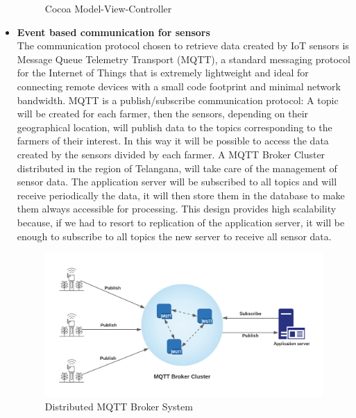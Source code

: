 \documentclass[10pt]{article} %
\begin{document}
\begin{itemize}
\begin{figure}[h]
        \caption{Cocoa Model-View-Controller}
        \label{fig:mvc}
    \end{figure}
    \newpage
    \item \textbf{Event based communication for sensors}\\The communication protocol chosen to retrieve 
    data created by IoT sensors is Message Queue Telemetry Transport (MQTT), a standard messaging 
    protocol for the Internet of Things that is extremely lightweight and ideal for connecting remote 
    devices with a small code footprint and minimal network bandwidth. MQTT is a publish/subscribe 
    communication protocol: A topic will be created for each farmer, then the sensors, depending on 
    their geographical location, will publish data to the topics corresponding to the farmers of 
    their interest. In this way it will be possible to access the data created by the sensors divided 
    by each farmer. A MQTT Broker Cluster distributed in the region of Telangana, will take care of 
    the management of sensor data. The application server will be subscribed to all topics and will 
    receive periodically the data, it will then store them in the database to make them always 
    accessible for processing.
    This design provides high scalability because, if we had to resort to replication of the 
    application server, it will be enough to subscribe to all topics the new server to receive 
    all sensor data.
    \begin{figure}[h!]
        \centering
        \includegraphics[scale=0.68]{images/mqtt.png}
        \caption{Distributed MQTT Broker System}
        \label{fig:mqtt}
    \end{figure}
\end{itemize}
\newpage
\end{document}
